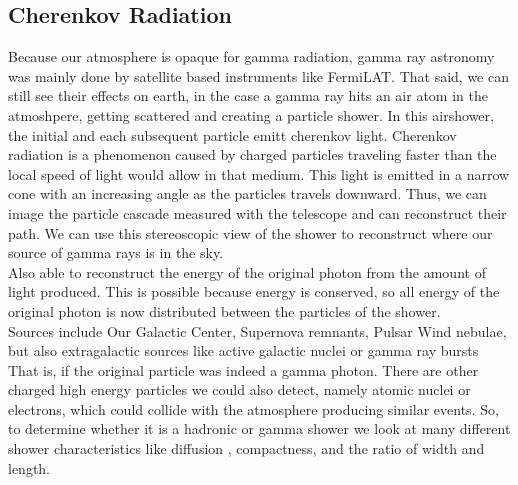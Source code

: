 \documentclass[12pt,article,type=msc,colorback,accentcolor=tud9c]{tudthesis}
\begin{document}
\subsection{Cherenkov Radiation}

\begin{wrapfigure}{R}{0.4\textwidth}
\centering
\texttt{[image: D:/OwnCloudData/00\_WriteUP/04\_Thesis/Pic/Proposal/Fig/\{gamma]}.jpg}
\caption{\label{fig:Cherenkov}Cherenkov Light}
\end{wrapfigure}

Because  our atmosphere is opaque for gamma radiation, gamma ray astronomy was mainly done by satellite based instruments like FermiLAT.
That said, we can still see their effects on earth, in the case a gamma ray hits an air atom in the atmoshpere, getting scattered and creating a particle shower. In this airshower, the initial and each subsequent particle emitt cherenkov light.
Cherenkov radiation is a phenomenon caused by charged particles traveling faster than the local speed of light would allow in that medium. This light is emitted in a narrow cone with an increasing angle as the particles travels downward.
Thus, we can image the particle cascade measured with the telescope and can reconstruct their path.
We can use this stereoscopic view of the shower to reconstruct where our source of gamma rays is in the sky.\\

Also able to reconstruct the energy of the original photon from the amount of light produced. This is possible because energy is conserved, so all energy of the original photon is now distributed between the particles of the shower.\\

Sources include Our Galactic Center, Supernova remnants, Pulsar Wind nebulae,  but also extragalactic sources like active galactic nuclei or gamma ray bursts\\



That is, if the original particle was indeed a gamma photon. There are other charged high energy particles we could also detect, namely  atomic nuclei or electrons, which could collide with the atmosphere producing similar events. So, to determine whether it is a hadronic or gamma shower we look at many different shower characteristics like diffusion , compactness, and the ratio of width and length.
\end{document}
